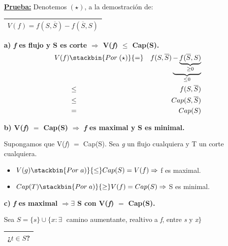 \documentclass[12pt,a4paper]{report}
\begin{document}
  		\textbf{\underline{Prueba:}} Denotemos $(\star)$, a la demostración de:
  			\begin{center}
  				\begin{tabular}{|c|} \hline $V(\textit{f}) = f(S, \overline{S}) - f(\overline{S},S)$ \\\hline \end{tabular}
  			\end{center}

  			\vspace{5mm}
  			\textbf{a) \textit{f} es flujo y S es corte $\Rightarrow$ V(\textit{f}) $\leq$ Cap(S).}
  				\begin{eqnarray}
  					\nonumber V(f) &\stackbin{Por \; (\star)}{=}& f(S, \overline{S})\underbrace{-\underbrace{f(\overline{S}, S)}_{\geq 0}}_{\leq 0} \\
  					\nonumber &\leq & f(S, \overline{S}) \\
  					\nonumber &\leq & Cap(S, \overline{S}) \\
  					\nonumber &=& Cap(S)
  				\end{eqnarray}

  			\textbf{b) V(\textit{f}) $=$ Cap(S) $\Rightarrow$ \textit{f} es maximal y S es minimal.}

  				\vspace{2mm}
  				\par Supongamos que V(\textit{f}) $=$ Cap(S). Sea \textit{g} un flujo cualquiera y T un corte cualquiera.
  				\pagebreak
  				\begin{itemize}
  					\item $V(g) \stackbin{Por \; a)}{\leq} Cap(S) = V(f) \Rightarrow$ f es maximal.
  					\item $Cap(T) \stackbin{Por \; a)}{\geq} V(f) = Cap(S) \Rightarrow$ S es minimal.
  				\end{itemize}

  			\vspace{5mm}
  			\textbf{c) \textit{f} es maximal $\Rightarrow \exists$ S con V(\textit{f}) $=$ Cap(S).}

  				\vspace{2mm}
  				\par Sea $S = \{s\} \cup \{x : \exists \;$ camino aumentante, realtivo a \textit{f}, entre \textit{s} y \textit{x}$\}$

  				\vspace{5mm}
  				\begin{tabular}{|c|} \hline ¿$t \in S$? \\\hline \end{tabular}
\end{document}
